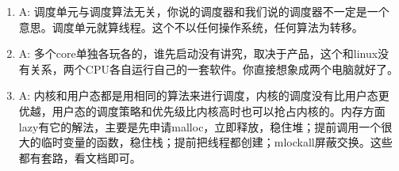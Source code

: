 \begin{enumerate}
  \item
\begin{tcolorbox}[colback=green!5,colframe=green!75!black]
\tcblower
A: 调度单元与调度算法无关，你说的调度器和我们说的调度器不一定是一个意思。调度单元就算线程。这个不以任何操作系统，任何算法为转移。
\end{tcolorbox}


  \item
\begin{tcolorbox}[colback=green!5,colframe=green!75!black]
\tcblower
A: 多个core单独各玩各的，谁先启动没有讲究，取决于产品，这个和linux没有关系，两个CPU各自运行自己的一套软件。你直接想象成两个电脑就好了。
\end{tcolorbox}



  \item
\begin{tcolorbox}[colback=green!5,colframe=green!75!black]
\tcblower
A: 内核和用户态都是用相同的算法来进行调度，内核的调度没有比用户态更优越，用户态的调度策略和优先级比内核高时也可以抢占内核的。内存方面lazy有它的解法，主要是先申请malloc，立即释放，稳住堆；提前调用一个很大的临时变量的函数，稳住栈；提前把线程都创建；mlockall屏蔽交换。这些都有套路，看文档即可。
\end{tcolorbox}
\end{enumerate}

